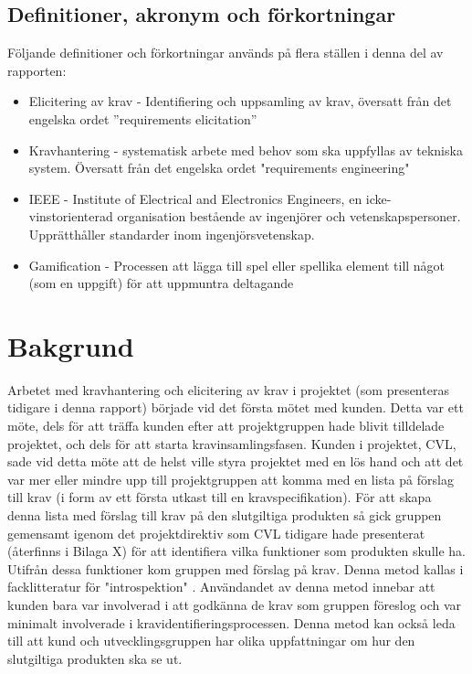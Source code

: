 \subsection{Definitioner, akronym och förkortningar}
Följande definitioner och förkortningar används på flera ställen i denna del av rapporten:
\begin{itemize}
	\item Elicitering av krav - Identifiering och uppsamling av krav, översatt från det engelska ordet ”requirements elicitation”
	\item Kravhantering - systematisk arbete med behov som ska uppfyllas av tekniska system. Översatt från det engelska ordet "requirements engineering"
	\item IEEE - Institute of Electrical and Electronics Engineers, en icke-vinstorienterad organisation bestående av ingenjörer och vetenskapspersoner. Upprätthåller standarder inom ingenjörsvetenskap.
	\item Gamification - Processen att lägga till spel eller spellika element till något (som en uppgift) för att uppmuntra deltagande
\end{itemize}
\section{Bakgrund}
\label{sec:background-jannering}

Arbetet med kravhantering och elicitering av krav i projektet (som presenteras tidigare i denna rapport) började vid det första mötet med kunden. Detta var ett möte, dels för att träffa kunden efter att projektgruppen hade blivit tilldelade projektet, och dels för att starta kravinsamlingsfasen. Kunden i projektet, CVL, sade vid detta möte att de helst ville styra projektet med en lös hand och att det var mer eller mindre upp till projektgruppen att komma med en lista på förslag till krav (i form av ett första utkast till en kravspecifikation). För att skapa denna lista med förslag till krav på den slutgiltiga produkten så gick gruppen gemensamt igenom det projektdirektiv som CVL tidigare hade presenterat (återfinns i Bilaga X) för att identifiera vilka funktioner som produkten skulle ha. Utifrån dessa funktioner kom gruppen med förslag på krav. Denna metod kallas i facklitteratur för "introspektion" \cite{goguen1993techniques}. Användandet av denna metod innebar att kunden bara var involverad i att godkänna de krav som gruppen föreslog och var minimalt involverade i kravidentifieringsprocessen. Denna metod kan också leda till att kund och utvecklingsgruppen har olika uppfattningar om hur den slutgiltiga produkten ska se ut. 

